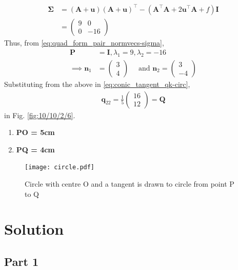 \documentclass[journal,10pt,twocolumn]{article}
\let\vec\mathbf
\newcommand{\myvec}[1]{\ensuremath{\begin{pmatrix}#1\end{pmatrix}}}
\providecommand{\brak}[1]{\ensuremath{\left(#1\right)}}
\begin{document}
{  \begin{align} 
		\bm{\Sigma} &= 
	   \brak{\vec{A}+\vec{u}}
	  \brak{\vec{A}+\vec{u}}^{\top}
   -
  \brak
  {
  \vec{A}^{\top}\vec{A} + 2\vec{u}^{\top}\vec{A} +f
  }\vec{I}
  \\
	  &=\myvec{9 & 0 \\ 0 & -16}
  \end{align}                    
  Thus,
  from 
  \eqref{eq:quad_form_pair_normvecs-sigma},
  \begin{align} 
	  \vec{P} &= \vec{I}, \lambda_1 = 9, \lambda_2 = -16
	  \\
	  \implies
	  \vec{n}_1 &= \myvec{3 \\[2mm] 4} \quad \text{ and }
  \vec{n}_2 = \myvec{3 \\[2mm] -4}
  \end{align} 
  Substituting  from the above in 
\eqref{eq:conic_tangent_qk-circ},
  \begin{align} 
	\vec{q}_{22} = \frac{1}{5}\myvec{16 \\ 12} = \vec{Q}
\end{align}
in Fig. 
		\ref{fig:10/10/2/6}.
\iffalse
\begin{enumerate}
	\item \textbf{PO = 5cm}
	\item \textbf{PQ = 4cm}
\end{enumerate}
\begin{figure}[h]
\centering
\texttt{[image: circle.pdf]}
\caption{Circle with centre O and a tangent is drawn to circle from point P to Q}
\label{fig:Circle}
\end{figure}

\section*{Solution}
\subsection*{Part 1}
}
\end{document}
